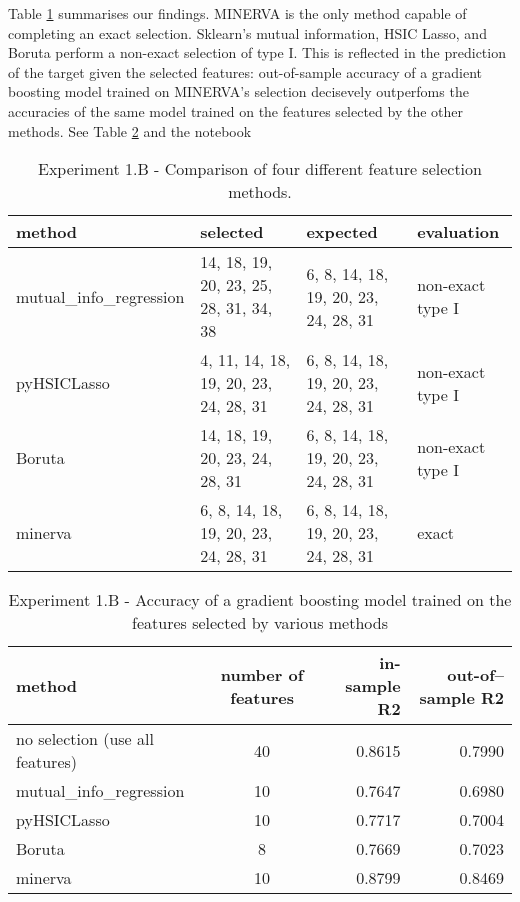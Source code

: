 Table
\ref{tab.experiment1B}
summarises our findings. 
MINERVA is the only method capable of completing an exact selection.
Sklearn's mutual information, 
HSIC Lasso,
and 
Boruta
perform a non-exact selection of type I.
This is reflected in the prediction of the target given the selected features:
out-of-sample accuracy of a gradient boosting model
trained on MINERVA's selection
decisevely outperfoms
the accuracies of the same model trained on
the features selected by the other methods.
See 
Table \ref{tab.experiment1Baccuracy}
and
the notebook






\begin{table}
	\centering
{
	\begin{tabular}{l|l|l|l}
		\textbf{method}
		&
		\textbf{selected}
		&
		\textbf{expected}
		&
		\textbf{evaluation}
		\\
		\hline
		mutual\_info\_regression
		&
		\tiny{
		14, 18, 19, 20, 23, 25, 28, 31, 34, 38
	}
		& 
		\tiny{
		6, 8, 14, 18, 19, 20, 23, 24, 28, 31
	}
		&
		non-exact type I
		\\
		pyHSICLasso
		&
		\tiny{
		4, 11, 14, 18, 19, 20, 23, 24, 28, 31
	}
		& 
		\tiny{
		6, 8, 14, 18, 19, 20, 23, 24, 28, 31
	}
		&
		non-exact type I
		\\
		Boruta
		&
		\tiny{
		14, 18, 19, 20, 23, 24, 28, 31
	}
		& 
		\tiny{
		6, 8, 14, 18, 19, 20, 23, 24, 28, 31
	}
		&
		non-exact type I
		\\
		minerva
		& 
		\tiny{
		6, 8, 14, 18, 19, 20, 23, 24, 28, 31
	}
		&
		\tiny{
		6, 8, 14, 18, 19, 20, 23, 24, 28, 31
	}
		&
		exact
	\end{tabular}
}
\caption{Experiment 1.B - Comparison of four different feature selection methods.}
\label{tab.experiment1B}
\end{table}


\begin{table}
	\centering
{
	\begin{tabular}{l|c|r|r}
		\textbf{method}
		&
		\textbf{number of features}
		&
		\textbf{in-sample R2}
		&
		\textbf{out-of--sample R2}
		\\
		\hline
		no selection (use all features)
		&
		40
		&
		0.8615
		&
		0.7990
		\\
		mutual\_info\_regression
		&
		10
		&
		0.7647
		& 
		0.6980
		\\
		pyHSICLasso
		&
		10
		& 
		0.7717
		&
		0.7004
		\\
		Boruta
		&
		8
		& 
		0.7669
		&
		0.7023
		\\
		minerva
		& 
		10
		&
		0.8799
		&
		0.8469
	\end{tabular}
}
\caption{Experiment 1.B - Accuracy of a gradient boosting model trained on the features selected by various methods}
\label{tab.experiment1Baccuracy}
\end{table}

